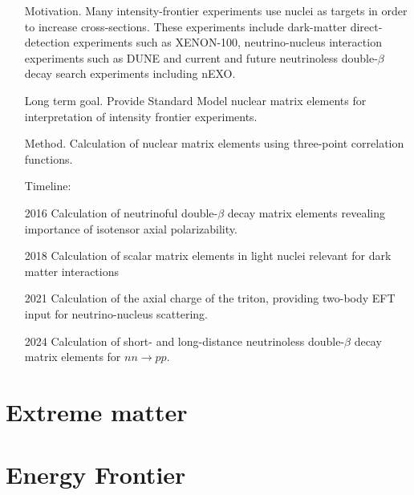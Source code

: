 \documentclass{article}
\begin{document}
\begin{itemize}  
    \item[Motivation.] Many intensity-frontier experiments use nuclei as targets in order to increase cross-sections. These experiments include dark-matter direct-detection experiments such as XENON-100, neutrino-nucleus interaction experiments such as DUNE and current and future neutrinoless double-$\beta$ decay search experiments including nEXO.
    
    \item[Long term goal.]  Provide Standard Model nuclear matrix elements for interpretation of intensity frontier experiments.
    
    \item[Method.] 
    Calculation of nuclear matrix elements using three-point correlation functions.
    
\item[Timeline:]
\item[2016] Calculation of neutrinoful double-$\beta$ decay matrix elements revealing importance of isotensor axial polarizability.
    \item[2018] Calculation of scalar matrix elements in light nuclei relevant for dark matter interactions 
    \item[2021] Calculation of the axial charge of the triton, providing two-body EFT input for neutrino-nucleus scattering.
    \item[2024] Calculation of short- and long-distance neutrinoless double-$\beta$ decay matrix elements for $nn\to pp$.
\end{itemize}




\section{Extreme matter}\label{sec:extreme}


\section{Energy Frontier}\label{sec:energy}






\end{document}
